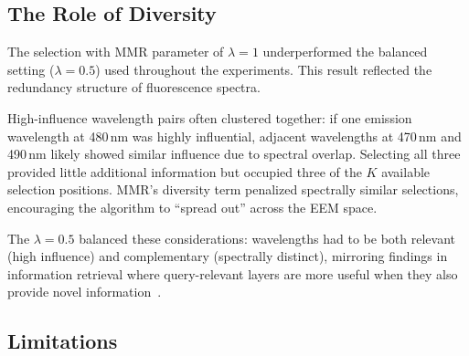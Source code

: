 \subsection{The Role of Diversity}
\label{sec:discussion_diversity}

The selection with MMR parameter of $\lambda = 1$ underperformed the balanced setting ($\lambda = 0.5$) used throughout the experiments.
This result reflected the redundancy structure of fluorescence spectra.

High-influence wavelength pairs often clustered together: if one emission wavelength at 480\,nm was highly influential, adjacent wavelengths at 470\,nm and 490\,nm likely showed similar influence due to spectral overlap.
Selecting all three provided little additional information but occupied three of the $K$ available selection positions.
MMR's diversity term penalized spectrally similar selections, encouraging the algorithm to ``spread out'' across the EEM space.

The $\lambda = 0.5$ balanced these considerations: wavelengths had to be both relevant (high influence) and complementary (spectrally distinct), mirroring findings in information retrieval where query-relevant layers are more useful when they also provide novel information~\cite{carbonell1998use}.

\subsection{Limitations}
\label{sec:discussion_limitations}


